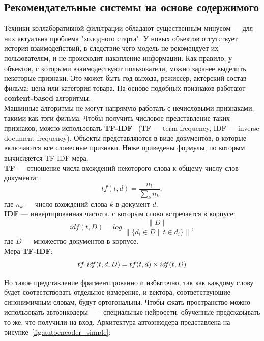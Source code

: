 \pagebreak
\subsection{Рекомендательные системы на основе содержимого}\label{subsec:content_rec_systems}
Техники коллаборативной фильтрации обладают существенным минусом --- для них актуальна проблема "холодного старта".
У новых объектов отсутствует история взаимодействий, в следствие чего модель не рекомендует их пользователям, и не происходит накопление информации.
Как правило, у объектов, с которыми взаимодествуют пользователи, можно заранее выделить некоторые признаки.
Это может быть год выхода, режиссёр, актёрский состав фильма; цена или категория товара.
На основе подобных признаков работают \textbf{content-based} алгоритмы.
\\Машинные алгоритмы не могут напрямую работать с нечисловыми признаками, такими как тэги фильма.
Чтобы получить числовое представление таких признаков, можно использовать \textbf{TF-IDF}~\cite{tfidf} (TF — term frequency, IDF — inverse document frequency).
Объекты представляются в виде документов, в которые включаются все словесные признаки.
Ниже приведены формулы, по которым вычисляется TF-IDF мера.
\\\textbf{TF} --- отношение числа вхождений некоторого слова к общему числу слов документа:
\begin{equation}\label{eq:tf}
        tf(t, d) = \frac{n_{t}}{\sum_{k}{n_{k}}},
\end{equation}
где $n_{k}$ --- число вхождений слова $k$ в документ $d$.
\\\textbf{IDF} --- инвертированная частота, с которым слово встречается в корпусе:
\begin{equation}\label{eq:idf}
        idf(t, D) = log~\frac{\|D\|}{\|\{d_{i} \in D \| t \in d_{i}\}\|},
\end{equation}
где $D$ --- множество документов в корпусе.
\\Мера \textbf{TF-IDF}:
\begin{equation}\label{eq:tf-idf}
        tf\textnormal{-}idf(t, d, D) = tf(t, d) \times idf(t, D)
\end{equation}

Но такое представление фрагментированно и избыточно, так как каждому слову будет соответствовать отдельное измерение, и вектора, соответствующие синонимичным словам, будут ортогональны.
Чтобы сжать пространство можно использовать автоэнкодеры~\cite{autoencoders} --- специальные нейросети, обученные предсказывать то же, что получили на вход.
Архитектура автоэнкодера представлена на рисунке~\ref{fig:autoencoder_simple}:

